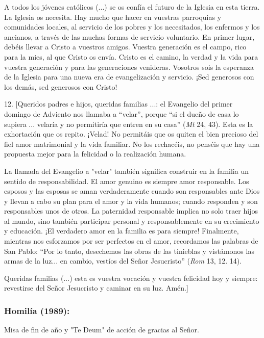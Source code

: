 \begin{body}
\begin{body}
A todos los jóvenes católicos (...) se os confía el futuro de la Iglesia en esta tierra. La Iglesia os necesita. Hay mucho que hacer en vuestras parroquias y comunidades locales, al servicio de los pobres y los necesitados, los enfermos y los ancianos, a través de las muchas formas de servicio voluntario. En primer lugar, debéis llevar a Cristo a vuestros amigos. Vuestra generación es el campo, rico para la mies, al que Cristo os envía. Cristo es el camino, la verdad y la vida para vuestra generación y para las generaciones venideras. Vosotros sois la esperanza de la Iglesia para una nueva era de evangelización y servicio. ¡Sed generosos con los demás, sed generosos con Cristo!

12. {[}Queridos padres e hijos, queridas familias ...: el Evangelio del primer domingo de Adviento nos llamaba a ``velar'', porque ``si el dueño de casa lo supiera ... velaría y no permitiría que entren en su casa'' (\emph{Mt} 24, 43). Esta es la exhortación que os repito. ¡Velad! No permitáis que os quiten el bien precioso del fiel amor matrimonial y la vida familiar. No los rechacéis, no penséis que hay una propuesta mejor para la felicidad o la realización humana.

La llamada del Evangelio a "velar" también significa construir en la familia un sentido de responsabilidad. El amor genuino es siempre amor responsable. Los esposos y las esposas se aman verdaderamente cuando son responsables ante Dios y llevan a cabo su plan para el amor y la vida humanos; cuando responden y son responsables unos de otros. La paternidad responsable implica no solo traer hijos al mundo, sino también participar personal y responsablemente en su crecimiento y educación. ¡El verdadero amor en la familia es para siempre! Finalmente, mientras nos esforzamos por ser perfectos en el amor, recordamos las palabras de San Pablo: ``Por lo tanto, desechemos las obras de las tinieblas y vistámonos las armas de la luz... en cambio, vestíos del Señor Jesucristo'' (\emph{Rom} 13, 12. 14).

Queridas familias (...) esta es vuestra vocación y vuestra felicidad hoy y siempre: revestirse del Señor Jesucristo y caminar en su luz. Amén.{]}
\end{body} 

\subsubsection{Homilía (1989): } Misa de fin de año y "Te Deum" de acción de gracias al Señor.


\end{body}
